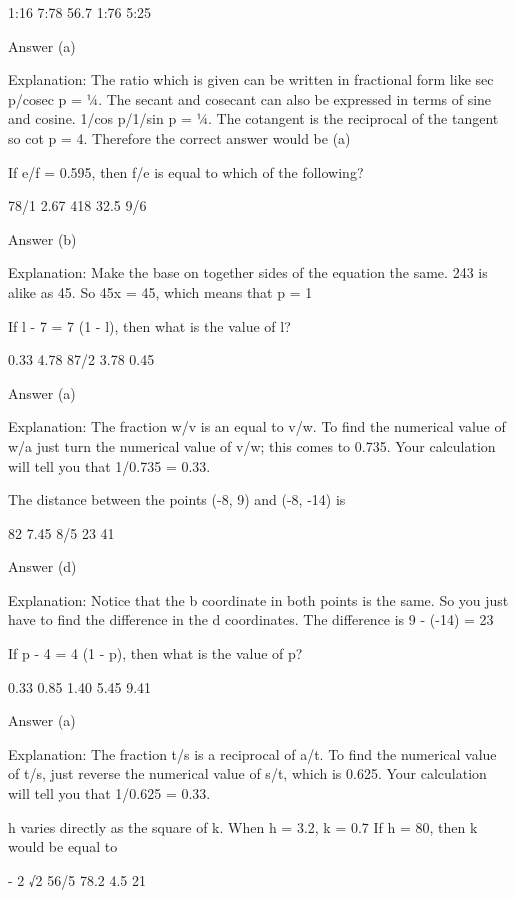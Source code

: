         1:16
        7:78
        56.7
        1:76
        5:25 

    Answer (a)

    Explanation: The ratio which is given can be written in fractional form like sec p/cosec p = ¼. The secant and cosecant can also be expressed in terms of sine and cosine. 1/cos p/1/sin p = ¼. The cotangent is the reciprocal of the tangent so cot p = 4. Therefore the correct answer would be (a)

    If e/f = 0.595, then f/e is equal to which of the following?

        78/1
        2.67
        418
        32.5
        9/6 

    Answer (b)

    Explanation: Make the base on together sides of the equation the same. 243 is alike as 45. So 45x  = 45, which means that p = 1

    If l - 7 = 7 (1 - l), then what is the value of l?

        0.33
        4.78
        87/2
        3.78
        0.45 

    Answer (a)

    Explanation: The fraction w/v is an equal to v/w. To find the numerical value of w/a just turn the numerical value of v/w; this comes to 0.735. Your calculation will tell you that 1/0.735 = 0.33.

    The distance between the points (-8, 9) and (-8, -14) is

        82
        7.45
        8/5
        23
        41 

    Answer (d)

    Explanation: Notice that the b coordinate in both points is the same. So you just have to find the difference in the d coordinates. The difference is 9 - (-14) = 23

    If p - 4 = 4 (1 - p), then what is the value of p?

        0.33
        0.85
        1.40
        5.45
        9.41 

    Answer (a)

    Explanation: The fraction t/s is a reciprocal of a/t. To find the numerical value of t/s, just reverse the numerical value of s/t, which is 0.625. Your calculation will tell you that 1/0.625 = 0.33.

    h varies directly as the square of k. When h = 3.2, k = 0.7 If h = 80, then k would be equal to

        - 2 √2
        56/5
        78.2
        4.5
        21 

